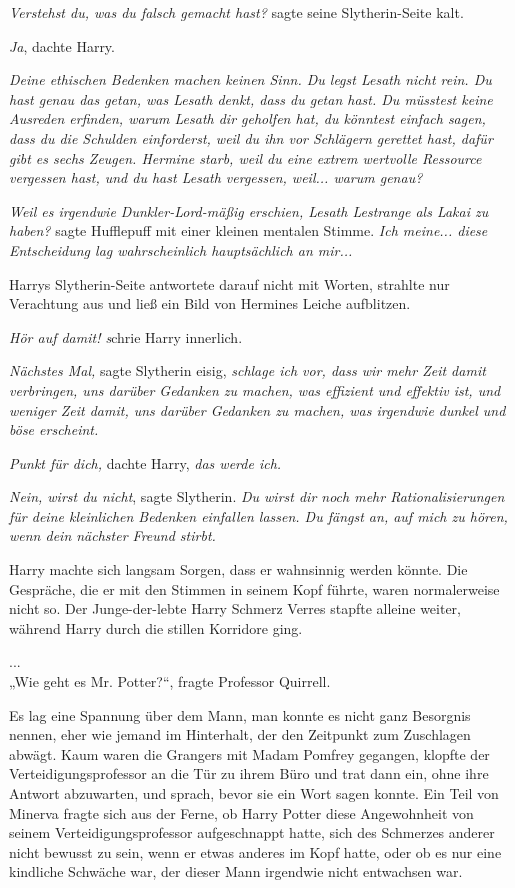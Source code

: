{\emph{Verstehst du, was du falsch gemacht hast?} sagte seine Slytherin-Seite kalt.

\emph{Ja}, dachte Harry.

\emph{Deine ethischen Bedenken machen keinen Sinn. Du legst Lesath nicht rein. Du hast genau das getan, was Lesath denkt, dass du getan hast. Du müsstest keine Ausreden erfinden, warum Lesath dir geholfen hat, du könntest einfach sagen, dass du die Schulden einforderst, weil du ihn vor Schlägern gerettet hast, dafür gibt es sechs Zeugen. Hermine starb, weil du eine extrem wertvolle Ressource vergessen hast, und du hast Lesath vergessen, weil... warum genau?}

\emph{Weil es irgendwie Dunkler-Lord-mäßig erschien, Lesath Lestrange als Lakai zu haben?} sagte Hufflepuff mit einer kleinen mentalen Stimme. \emph{Ich meine... diese Entscheidung lag wahrscheinlich hauptsächlich an mir...}

Harrys Slytherin-Seite antwortete darauf nicht mit Worten, strahlte nur Verachtung aus und ließ ein Bild von Hermines Leiche aufblitzen.

\emph{Hör auf damit! s}chrie Harry innerlich.

\emph{Nächstes Mal,} sagte Slytherin eisig, \emph{schlage ich vor, dass wir mehr Zeit damit verbringen, uns darüber Gedanken zu machen, was effizient und effektiv ist, und weniger Zeit damit, uns darüber Gedanken zu machen, was irgendwie dunkel und böse erscheint.}

\emph{Punkt für dich,} dachte Harry, \emph{das werde ich.}

\emph{Nein, wirst du nicht}, sagte Slytherin. \emph{Du wirst dir noch mehr Rationalisierungen für deine kleinlichen Bedenken einfallen lassen. Du fängst an, auf mich zu hören, wenn dein nächster Freund stirbt.}

Harry machte sich langsam Sorgen, dass er wahnsinnig werden könnte. Die Gespräche, die er mit den Stimmen in seinem Kopf führte, waren normalerweise nicht so. Der Junge-der-lebte Harry Schmerz Verres stapfte alleine weiter, während Harry durch die stillen Korridore ging.

...\\ „Wie geht es Mr. Potter?“, fragte Professor Quirrell.

Es lag eine Spannung über dem Mann, man konnte es nicht ganz Besorgnis nennen, eher wie jemand im Hinterhalt, der den Zeitpunkt zum Zuschlagen abwägt. Kaum waren die Grangers mit Madam Pomfrey gegangen, klopfte der Verteidigungsprofessor an die Tür zu ihrem Büro und trat dann ein, ohne ihre Antwort abzuwarten, und sprach, bevor sie ein Wort sagen konnte. Ein Teil von Minerva fragte sich aus der Ferne, ob Harry Potter diese Angewohnheit von seinem Verteidigungsprofessor aufgeschnappt hatte, sich des Schmerzes anderer nicht bewusst zu sein, wenn er etwas anderes im Kopf hatte, oder ob es nur eine kindliche Schwäche war, der dieser Mann irgendwie nicht entwachsen war.

}
